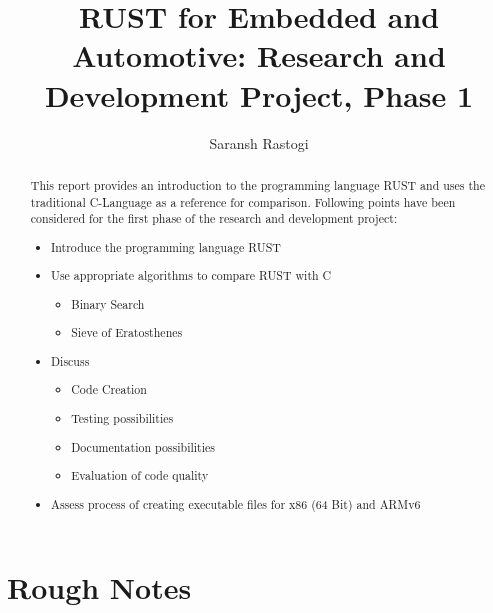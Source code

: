 \documentclass{article}
\title{RUST for Embedded and Automotive: Research and Development Project, Phase 1}
\author{Saransh Rastogi}
\begin{document}
\maketitle
\thispagestyle{empty}

\begin{abstract}
This report provides an introduction to the programming language RUST and uses the traditional C-Language as a reference for comparison. Following points have been considered for the first phase of the research and development project:
\begin{itemize}
\item Introduce the programming language RUST
\item Use appropriate algorithms to compare RUST with C
\begin{itemize}
    \item Binary Search
    \item Sieve of Eratosthenes
\end{itemize}
\item Discuss
\begin{itemize}
    \item Code Creation
    \item Testing possibilities
    \item Documentation possibilities
    \item Evaluation of code quality
\end{itemize}
\item Assess process of creating executable files for x86 (64 Bit) and ARMv6
\end{itemize}
\end{abstract}

\newpage

\tableofcontents

\newpage

\section{Rough Notes}
\end{document}
